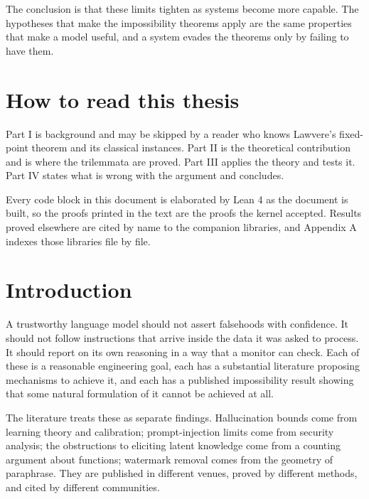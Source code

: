 \documentclass{memoir}
\begin{document}
The conclusion is that these limits tighten as systems become more capable. The
hypotheses that make the impossibility theorems apply are the same properties
that make a model useful, and a system evades the theorems only by failing to
have them.




\chapter{How to read this thesis}\label{Two--Schemas--of--Impossibility-005F-005F-005F--Machine--Checked--Limits--of--Trustworthy--Machine--Learning-005F-005F-005F--and--Why--They--Tighten--with--Capability----How--to--read--this--thesis}

Part I is background and may be skipped by a reader who knows Lawvere's
fixed-point theorem and its classical instances. Part II is the theoretical
contribution and is where the trilemmata are proved. Part III applies the theory
and tests it. Part IV states what is wrong with the argument and concludes.

Every code block in this document is elaborated by Lean 4 as the document is
built, so the proofs printed in the text are the proofs the kernel accepted.
Results proved elsewhere are cited by name to the companion libraries, and
Appendix A indexes those libraries file by file.




\chapter{Introduction}\label{Two--Schemas--of--Impossibility-005F-005F-005F--Machine--Checked--Limits--of--Trustworthy--Machine--Learning-005F-005F-005F--and--Why--They--Tighten--with--Capability----Introduction}

A trustworthy language model should not assert falsehoods with confidence. It
should not follow instructions that arrive inside the data it was asked to
process. It should report on its own reasoning in a way that a monitor can
check. Each of these is a reasonable engineering goal, each has a substantial
literature proposing mechanisms to achieve it, and each has a published
impossibility result showing that some natural formulation of it cannot be
achieved at all.

The literature treats these as separate findings. Hallucination bounds come from
learning theory and calibration; prompt-injection limits come from security
analysis; the obstructions to eliciting latent knowledge come from a counting
argument about functions; watermark removal comes from the geometry of
paraphrase. They are published in different venues, proved by different methods,
and cited by different communities.
\end{document}
